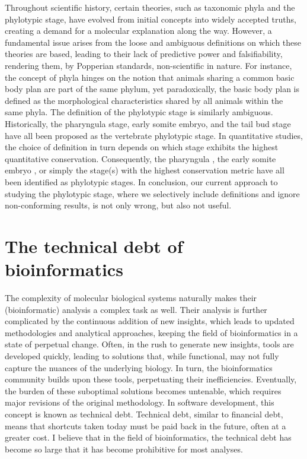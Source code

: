 Throughout scientific history, certain theories, such as taxonomic phyla and the phylotypic stage, have evolved from initial concepts into widely accepted truths, creating a demand for a molecular explanation along the way. However, a fundamental issue arises from the loose and ambiguous definitions on which these theories are based, leading to their lack of predictive power and falsifiability, rendering them, by Popperian standards, non-scientific in nature. For instance, the concept of phyla hinges on the notion that animals sharing a common basic body plan are part of the same phylum, yet paradoxically, the basic body plan is defined as the morphological characteristics shared by all animals within the same phyla\cite{BUDD2000,scholtz2004bauplane}. The definition of the phylotypic stage is similarly ambiguous. Historically, the pharyngula stage\cite{BALLARD1981}, early somite embryo\cite{Alberch1993}, and the tail bud stage \cite{Slack1993} have all been proposed as the vertebrate phylotypic stage. In quantitative studies, the choice of definition in turn depends on which stage exhibits the highest quantitative conservation. Consequently, the pharyngula \cite{Irie2011,marletaz2018}, the early somite embryo \cite{DomazetLoso2010}, or simply the stage(s) with the highest conservation metric\cite{Kalinka2010,Cordero2020} have all been identified as phylotypic stages. In conclusion, our current approach to studying the phylotypic stage, where we selectively include definitions and ignore non-conforming results, is not only wrong, but also not useful.

\section{The technical debt of bioinformatics}

The complexity of molecular biological systems naturally makes their (bioinformatic) analysis a complex task as well. Their analysis is further complicated by the continuous addition of new insights, which leads to updated methodologies and analytical approaches, keeping the field of bioinformatics in a state of perpetual change. Often, in the rush to generate new insights, tools are developed quickly, leading to solutions that, while functional, may not fully capture the nuances of the underlying biology. In turn, the bioinformatics community builds upon these tools, perpetuating their inefficiencies. Eventually, the burden of these suboptimal solutions becomes untenable, which requires major revisions of the original methodology. In software development, this concept is known as technical debt. Technical debt, similar to financial debt, means that shortcuts taken today must be paid back in the future, often at a greater cost. I believe that in the field of bioinformatics, the technical debt has become so large that it has become prohibitive for most analyses.

